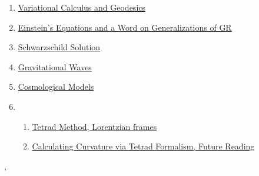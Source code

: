 \documentclass[11pt]{article}
\renewcommand{\today}{\shortmonthname[\the\month] \the \day,  \the\year}
\begin{document}
\begin{enumerate}
\begin{enumerate}
	\end{enumerate}
	\item \href{https://mp.weixin.qq.com/s/YxraoThVHIKJHVI991chjA}{Variational Calculus and Geodesics}  %
	\item \href{https://mp.weixin.qq.com/s/bX1p4282QiqkzcK6jRgPWA}{Einstein's Equations and a Word on Generalizations of GR}  %
	\item \href{https://mp.weixin.qq.com/s/dCVPhYe3qsZXxvVMYEAvYg}{Schwarzschild Solution}  %
	\item \href{https://mp.weixin.qq.com/s/pB1w4j6I0VirVWmtj6oSFw}{Gravitational Waves}  %
	\item \href{https://mp.weixin.qq.com/s/eSJ0X6kVEQibJRMUbnEhSA}{Cosmological Models}  %
	\item 
	\begin{enumerate}
		\item \href{https://mp.weixin.qq.com/s/Wxlfse3LZ41bnL16941PSw}{Tetrad Method, Lorentzian frames}  %
		\item \href{https://mp.weixin.qq.com/s/LDyYlw4aA5lslgVEeogXBw}{Calculating Curvature via Tetrad Formalism, Future Reading}	%
	\end{enumerate}
\end{enumerate}


%
\begin{flushright}
	\tiny \today 
\end{flushright}
\end{document}
